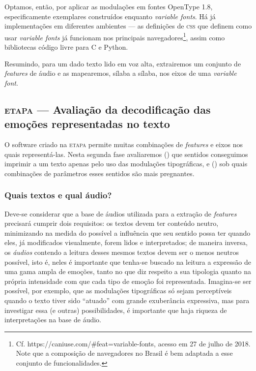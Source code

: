 \documentclass[a4paper,11pt,titlepage,singlespacing]{article}
\newcommand{\etapa}[1]{\textsc{etapa \oldstylenums{#1}}}
\newcommand{\num}[1]{(\oldstylenums{#1})}
\begin{document}
Optamos, então, por aplicar as modulações em fontes OpenType 1.8, especificamente exemplares construídos enquanto \textit{variable fonts}. Há já implementações em diferentes ambientes — as definições de \textsc{css} que definem como usar \textit{variable fonts} já funcionam nos principais navegadores\footnote{Cf. https://caniuse.com/\#feat=variable-fonts, acesso em 27 de julho de 2018. Note que a composição de navegadores no Brasil é bem adaptada a esse conjunto de funcionalidades.}, assim como  bibliotecas código livre para C e Python.

Resumindo, para um dado texto lido em voz alta, extrairemos um conjunto de \textit{features} de áudio e as mapearemos, sílaba a sílaba, nos eixos de uma \textit{variable font}.


\subsection{\etapa{2} — Avaliação da decodificação das emoções representadas no texto}
\label{subsec:etapa2}

O software criado na \etapa{1} permite muitas combinações de \textit{features} e eixos nos quais representá-las. Nesta segunda fase avaliaremos \num{1} que sentidos conseguimos imprimir a um texto apenas pelo uso das modulações tipográficas, e \num{2} sob quais combinações de parâmetros esses sentidos são mais pregnantes.

\subsubsection*{Quais textos e qual áudio?}

Deve-se considerar que a base de áudios utilizada para a extração de \textit{features} precisará cumprir dois requisitos: os textos devem ter conteúdo neutro, minimizando na medida do possível a influência que seu sentido possa ter quando eles, já modificados visualmente, forem lidos e interpretados; de maneira inversa, os \textit{áudios} contendo a leitura desses mesmos textos devem ser o menos neutros possível, isto é, neles é importante que tenha-se buscado na leitura a expressão de uma gama ampla de emoções, tanto no que diz respeito a sua tipologia quanto na própria intensidade com que cada tipo de emoção foi representada. Imagina-se ser possível, por exemplo, que as modulações tipográficas só sejam perceptíveis quando o texto tiver sido ``atuado'' com grande exuberância expressiva, mas para investigar essa (e outras) possibilidades, é importante que haja riqueza de interpretações na base de áudio.
\end{document}
